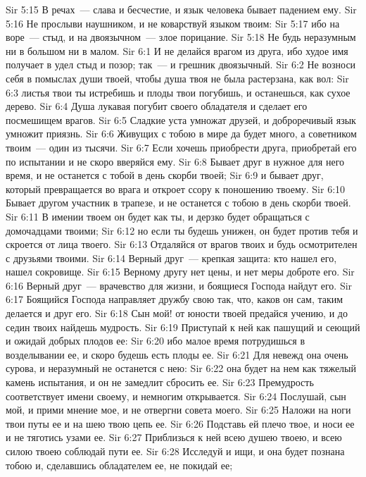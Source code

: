 \vs Sir 5:15 В речах~--- слава и бесчестие, и язык человека бывает падением ему.
\vs Sir 5:16 Не прослыви наушником, и не коварствуй языком твоим:
\vs Sir 5:17 ибо на воре~--- стыд, и на двоязычном~--- злое порицание.
\vs Sir 5:18 Не будь неразумным ни в большом ни в малом.
\vs Sir 6:1 И не делайся врагом из друга, ибо худое имя получает в удел стыд и позор; так~--- и грешник двоязычный.
\vs Sir 6:2 Не возноси себя в помыслах души твоей, чтобы душа твоя не была растерзана, как вол:
\vs Sir 6:3 листья твои ты истребишь и плоды твои погубишь, и останешься, как сухое дерево.
\vs Sir 6:4 Душа лукавая погубит своего обладателя и сделает его посмешищем врагов.
\rsbpar\vs Sir 6:5 Сладкие уста умножат друзей, и доброречивый язык умножит приязнь.
\vs Sir 6:6 Живущих с тобою в мире да будет много, а советником твоим~--- один из тысячи.
\vs Sir 6:7 Если хочешь приобрести друга, приобретай его по испытании и не скоро вверяйся ему.
\vs Sir 6:8 Бывает друг в нужное для него время, и не останется с тобой в день скорби твоей;
\vs Sir 6:9 и бывает друг, который превращается во врага и откроет ссору к поношению твоему.
\vs Sir 6:10 Бывает другом участник в трапезе, и не останется с тобою в день скорби твоей.
\vs Sir 6:11 В имении твоем он будет как ты, и дерзко будет обращаться с домочадцами твоими;
\vs Sir 6:12 но если ты будешь унижен, он будет против тебя и скроется от лица твоего.
\vs Sir 6:13 Отдаляйся от врагов твоих и будь осмотрителен с друзьями твоими.
\vs Sir 6:14 Верный друг~--- крепкая защита: кто нашел его, нашел сокровище.
\vs Sir 6:15 Верному другу нет цены, и нет меры доброте его.
\vs Sir 6:16 Верный друг~--- врачевство для жизни, и боящиеся Господа найдут его.
\vs Sir 6:17 Боящийся Господа направляет дружбу свою так, что, каков он сам, таким делается и друг его.
\rsbpar\vs Sir 6:18 Сын мой! от юности твоей предайся учению, и до седин твоих найдешь мудрость.
\vs Sir 6:19 Приступай к ней как пашущий и сеющий и ожидай добрых плодов ее:
\vs Sir 6:20 ибо малое время потрудишься в возделывании ее, и скоро будешь есть плоды ее.
\vs Sir 6:21 Для невежд она очень сурова, и неразумный не останется с нею:
\vs Sir 6:22 она будет на нем как тяжелый камень испытания, и он не замедлит сбросить ее.
\vs Sir 6:23 Премудрость соответствует имени своему, и немногим открывается.
\vs Sir 6:24 Послушай, сын мой, и прими мнение мое, и не отвергни совета моего.
\vs Sir 6:25 Наложи на ноги твои путы ее и на шею твою цепь ее.
\vs Sir 6:26 Подставь ей плечо твое, и носи ее и не тяготись узами ее.
\vs Sir 6:27 Приблизься к ней всею душею твоею, и всею силою твоею соблюдай пути ее.
\vs Sir 6:28 Исследуй и ищи, и она будет познана тобою и, сделавшись обладателем ее, не покидай ее;
